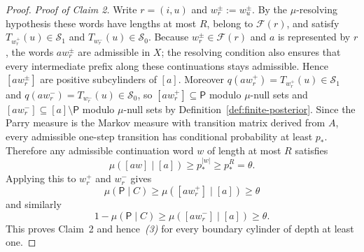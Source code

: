 \documentclass{etds}%
\numberwithin{equation}{section}
\theoremstyle{plain}
\theoremstyle{definition}
\theoremstyle{remark}
\begin{document}
\begin{proof}
\smallskip
\noindent\emph{Proof of Claim 2.}
Write $r=(i,u)$ and $w_r^\pm:=w_u^\pm$.  By the $\mu$-resolving hypothesis these words have
lengths at most $R$, belong to $\mathcal{F}(r)$, and satisfy
$T_{w_r^+}(u)\in \mathcal{S}_1$ and $T_{w_r^-}(u)\in \mathcal{S}_0$.  Because
$w_r^\pm\in\mathcal{F}(r)$ and $a$ is represented by $r$, the words
$aw_r^\pm$ are admissible in $X$; the resolving condition also ensures that
every intermediate prefix along these continuations stays admissible.  Hence
$[aw_r^\pm]$ are positive subcylinders of $[a]$.  Moreover
$q(aw_r^+)=T_{w_r^+}(u)\in \mathcal{S}_1$ and
$q(aw_r^-)=T_{w_r^-}(u)\in \mathcal{S}_0$, so
$[aw_r^+]\subseteq \mathsf{P}$ modulo $\mu$-null sets and
$[aw_r^-]\subseteq [a]\setminus \mathsf{P}$ modulo $\mu$-null sets by
Definition~\ref{def:finite-posterior}.  Since the Parry measure is the Markov
measure with transition matrix derived from $A$, every admissible one-step
transition has conditional probability at least $p_*$.  Therefore any
admissible continuation word $w$ of length at most $R$ satisfies
\[
\mu([aw]\mid[a])\ge p_*^{|w|}\ge p_*^R=\theta.
\]
Applying this to $w_r^+$ and $w_r^-$ gives
\[
\mu(\mathsf{P}\mid C)\ge \mu([aw_r^+]\mid[a])\ge \theta
\]
and similarly
\[
1-\mu(\mathsf{P}\mid C)\ge \mu([aw_r^-]\mid[a])\ge \theta.
\]
This proves Claim~2 and hence~\emph{(3)} for every boundary cylinder of depth
at least one.


\end{proof}
\end{document}
